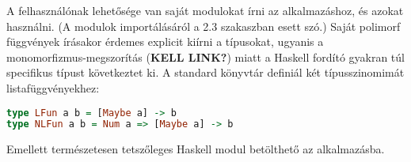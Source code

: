 A felhasználónak lehetősége van saját modulokat írni az alkalmazáshoz, és azokat használni. (A modulok importálásáról a 2.3 szakaszban esett szó.) Saját polimorf függvények írásakor érdemes explicit kiírni a típusokat, ugyanis a monomorfizmus-megszorítás (\textbf{KELL LINK?}) miatt a Haskell fordító gyakran túl specifikus típust következtet ki. A standard könyvtár definiál két típusszinomimát listafüggvényekhez:

\begin{lstlisting}[caption={LFun és NLFun}, language={Haskell},label=src:lfun]
type LFun a b = [Maybe a] -> b
type NLFun a b = Num a => [Maybe a] -> b
\end{lstlisting}

Emellett természetesen tetszőleges Haskell modul betölthető az alkalmazásba.	